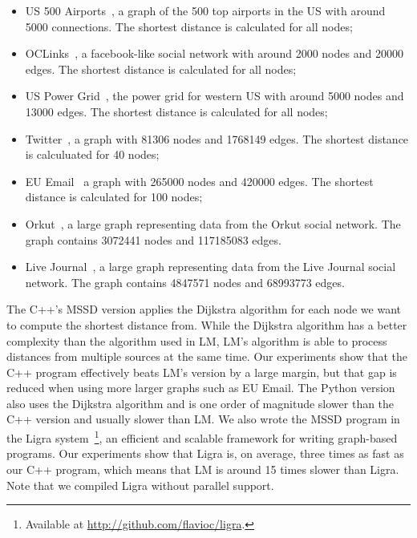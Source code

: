 \begin{itemize}
   \item US 500 Airports~\cite{usairports,tnet}, a graph of the 500 top airports in the US with around
      5000 connections. The shortest distance is calculated for all nodes;
      
   \item OCLinks~\cite{tnet,oclinks}, a facebook-like social network with around 2000 nodes and 20000 edges. The shortest
      distance is calculated for all nodes;

   \item US Power Grid~\cite{tnet,uspowergrid}, the power grid for western US with around 5000
      nodes and 13000 edges. The shortest distance is calculated for all nodes;

   \item Twitter~\cite{snapnets,NIPS2012_4532}, a graph with 81306 nodes and 1768149 edges.
      The shortest distance is calculuated for 40 nodes; 

   \item EU Email~\cite{snapnets,Leskovec:2007:GED:1217299.1217301} a graph with
      265000 nodes and 420000 edges. The shortest distance is calculated for 100
      nodes;


   \item Orkut~\cite{snapnets,Yang:2012:DEN:2350190.2350193}, a large graph
      representing data from the Orkut social network. The graph contains
      3072441 nodes and 117185083 edges.

   \item Live Journal~\cite{snapnets,Backstrom06groupformation}, a large graph representing data from the
      Live Journal social network. The graph contains 4847571 nodes and 68993773
      edges.

\end{itemize}

The C++'s MSSD version applies the Dijkstra algorithm for each node we want to
compute the shortest distance from. While the Dijkstra algorithm has a better
complexity than the algorithm used in LM, LM's algorithm is able to
process distances from multiple sources at the same time. Our experiments show
that the C++ program effectively beats LM's version by a large margin, but that
gap is reduced when using more larger graphs such as EU Email. The Python
version also uses the Dijkstra algorithm and is one order of magnitude slower
than the C++ version and usually slower than LM. We also wrote the MSSD program
in the Ligra system~\cite{Shun:2013:LLG:2517327.2442530}\footnote{Available at
   \url{http://github.com/flavioc/ligra}.}, an efficient and scalable framework
   for writing graph-based programs. Our experiments show that Ligra is, on
   average, three times as fast as our C++ program, which means that LM is
   around 15 times slower than Ligra. Note that we compiled Ligra without
   parallel support.

